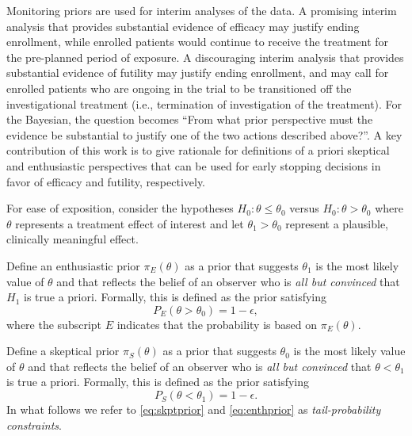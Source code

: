 \documentclass[useAMS,usenatbib,referee]{biom}
\begin{document}
Monitoring priors are used for interim analyses of the data. 
A promising interim analysis that provides substantial evidence of efficacy may justify ending enrollment, while enrolled patients would continue 
to receive the treatment for the pre-planned period of exposure. 
%
A discouraging interim analysis that provides substantial evidence of futility may justify ending enrollment, and may call for enrolled patients 
who are ongoing in the trial to be transitioned off the investigational treatment (i.e., termination of investigation of the treatment). 
%
For the Bayesian, the question becomes ``From what prior perspective must the evidence be substantial to justify one of the two actions described above?''.
%
A key contribution of this work is to give rationale for definitions of a priori skeptical and enthusiastic perspectives that can be used for early stopping decisions 
in favor of efficacy and futility, respectively.


For ease of exposition, consider the hypotheses $H_0: \theta \le \theta_0$ versus $H_0: \theta > \theta_0$ where $\theta$ represents a treatment effect of interest and let $\theta_1>\theta_0$ 
represent a plausible, clinically meaningful effect.

Define an enthusiastic prior $\pi_{E}(\theta)$ as a prior that suggests $\theta_1$ is the most likely value of $\theta$ 
and that reflects the belief of an observer who is \textit{all but convinced} that $H_1$ is true a priori. 
%
Formally, this is defined as the prior satisfying
\begin{equation}\label{eq:skptprior}
P_E(\theta >\theta_0)=1-\epsilon,
\end{equation}
where the subscript $E$ indicates that the probability is based on $\pi_{E}(\theta)$.

Define a skeptical prior $\pi_{S}(\theta)$ as a prior that suggests $\theta_0$ is the most likely value of $\theta$ 
and that reflects the belief of an observer who is \textit{all but convinced} that $\theta <\theta_1$ is true a priori. 
%
Formally, this is defined as the prior satisfying
\begin{equation}\label{eq:enthprior}
P_S(\theta <\theta_1)=1-\epsilon.
\end{equation}
%
In what follows we refer to \eqref{eq:skptprior} and \eqref{eq:enthprior} as \textit{tail-probability constraints}.
\end{document}
